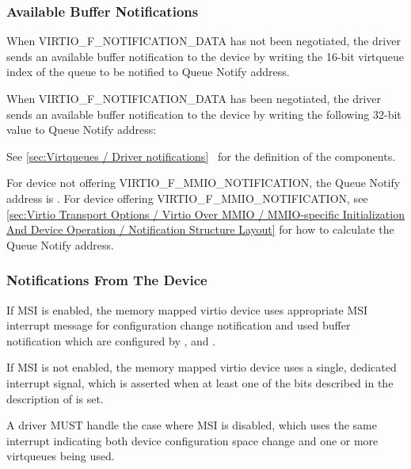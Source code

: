 \subsubsection{Available Buffer Notifications}\label{sec:Virtio Transport Options / Virtio Over MMIO / MMIO-specific Initialization And Device Operation / Available Buffer Notifications}

When VIRTIO_F_NOTIFICATION_DATA has not been negotiated,
the driver sends an available buffer notification to the device by writing
the 16-bit virtqueue index
of the queue to be notified to Queue Notify address.

When VIRTIO_F_NOTIFICATION_DATA has been negotiated,
the driver sends an available buffer notification to the device by writing
the following 32-bit value to Queue Notify address:


See \ref{sec:Virtqueues / Driver notifications}~
for the definition of the components.

For device not offering VIRTIO_F_MMIO_NOTIFICATION, the Queue Notify address is .
For device offering VIRTIO_F_MMIO_NOTIFICATION, see \ref{sec:Virtio Transport Options / Virtio Over MMIO / MMIO-specific Initialization And Device Operation / Notification Structure Layout}
for how to calculate the Queue Notify address.

\subsubsection{Notifications From The Device}\label{sec:Virtio Transport Options / Virtio Over MMIO / MMIO-specific Initialization And Device Operation / Notifications From The Device}

If MSI is enabled, the memory mapped virtio
device uses appropriate MSI interrupt message
for configuration change notification and used buffer notification which are
configured by ,  and .

If MSI is not enabled, the memory mapped virtio device
uses a single, dedicated
interrupt signal, which is asserted when at least one of the
bits described in the description of 
is set.

A driver MUST handle the case where MSI is disabled, which uses the same interrupt indicating both device configuration
space change and one or more virtqueues being used.

